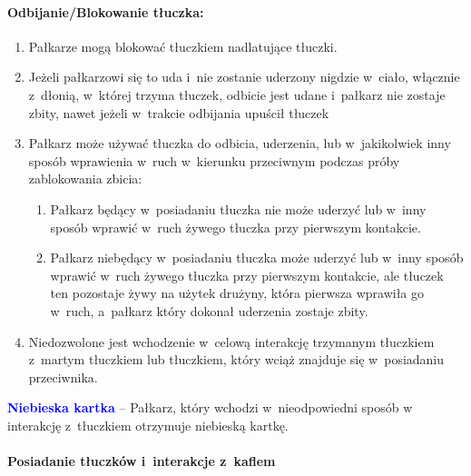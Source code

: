 \documentclass[12pt,a4paper]{article}
\newcommand\bluecard[1]{\bgroup\textcolor{blue}{\textbf{#1}}}
\begin{document}
\paragraph{Odbijanie/Blokowanie tłuczka:}

\begin{enumerate}
	\item
	      Pałkarze mogą blokować tłuczkiem nadlatujące tłuczki.
	\item
	      Jeżeli pałkarzowi się to uda i~nie zostanie uderzony nigdzie w~ciało,
	      włącznie z~dłonią, w~której trzyma tłuczek, odbicie jest udane i~pałkarz nie zostaje zbity, nawet jeżeli w~trakcie odbijania upuścił
	      tłuczek
	\item
	      Pałkarz może używać tłuczka do odbicia, uderzenia, lub w~jakikolwiek
	      inny sposób wprawienia w~ruch w~kierunku przeciwnym podczas próby
	      zablokowania zbicia:

	      \begin{enumerate}
		      \item
		            Pałkarz będący w~posiadaniu tłuczka nie może uderzyć lub w~inny
		            sposób wprawić w~ruch żywego tłuczka przy pierwszym kontakcie.
		      \item
		            Pałkarz niebędący w~posiadaniu tłuczka może uderzyć lub w~inny
		            sposób wprawić w~ruch żywego tłuczka przy pierwszym kontakcie, ale
		            tłuczek ten pozostaje żywy na użytek drużyny, która pierwsza wprawiła go w~ruch, a~pałkarz który dokonał uderzenia zostaje zbity.
	      \end{enumerate}
	\item
	      Niedozwolone jest wchodzenie w~celową interakcję trzymanym tłuczkiem z~martym tłuczkiem lub tłuczkiem, który wciąż znajduje
	      się w~posiadaniu przeciwnika.
\end{enumerate}

\bluecard{Niebieska kartka} -- Pałkarz, który wchodzi w~nieodpowiedni sposób
w interakcję z~tłuczkiem otrzymuje niebieską kartkę.

\paragraph{Posiadanie tłuczków i~interakcje z~kaflem}
\end{document}
